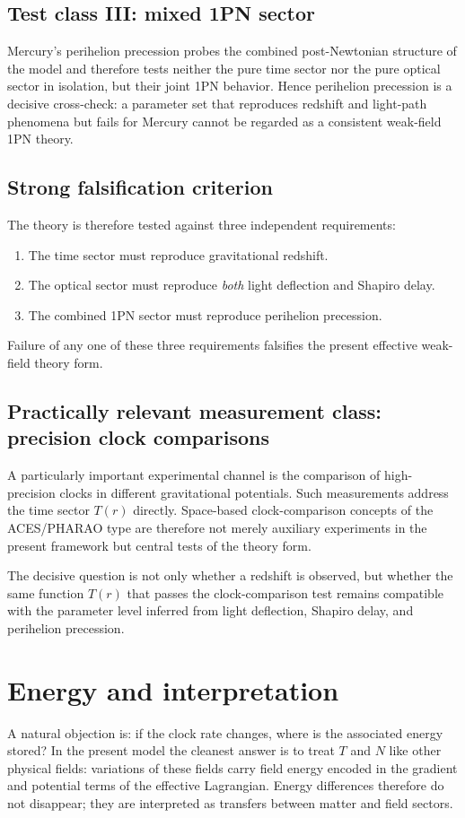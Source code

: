 \documentclass[11pt,a4paper]{article}
\begin{document}
\subsection{Test class III: mixed 1PN sector}
Mercury's perihelion precession probes the combined post-Newtonian structure of the model and therefore tests neither the pure time sector nor the pure optical sector in isolation, but their joint 1PN behavior. Hence perihelion precession is a decisive cross-check: a parameter set that reproduces redshift and light-path phenomena but fails for Mercury cannot be regarded as a consistent weak-field 1PN theory.

\subsection{Strong falsification criterion}
The theory is therefore tested against three independent requirements:
\begin{enumerate}
    \item The time sector must reproduce gravitational redshift.
    \item The optical sector must reproduce \emph{both} light deflection and Shapiro delay.
    \item The combined 1PN sector must reproduce perihelion precession.
\end{enumerate}
Failure of any one of these three requirements falsifies the present effective weak-field theory form.

\subsection{Practically relevant measurement class: precision clock comparisons}
A particularly important experimental channel is the comparison of high-precision clocks in different gravitational potentials. Such measurements address the time sector $T(r)$ directly. Space-based clock-comparison concepts of the ACES/PHARAO type are therefore not merely auxiliary experiments in the present framework but central tests of the theory form.

The decisive question is not only whether a redshift is observed, but whether the same function $T(r)$ that passes the clock-comparison test remains compatible with the parameter level inferred from light deflection, Shapiro delay, and perihelion precession.

\section{Energy and interpretation}
A natural objection is: if the clock rate changes, where is the associated energy stored? In the present model the cleanest answer is to treat $T$ and $N$ like other physical fields: variations of these fields carry field energy encoded in the gradient and potential terms of the effective Lagrangian. Energy differences therefore do not disappear; they are interpreted as transfers between matter and field sectors.
\end{document}

